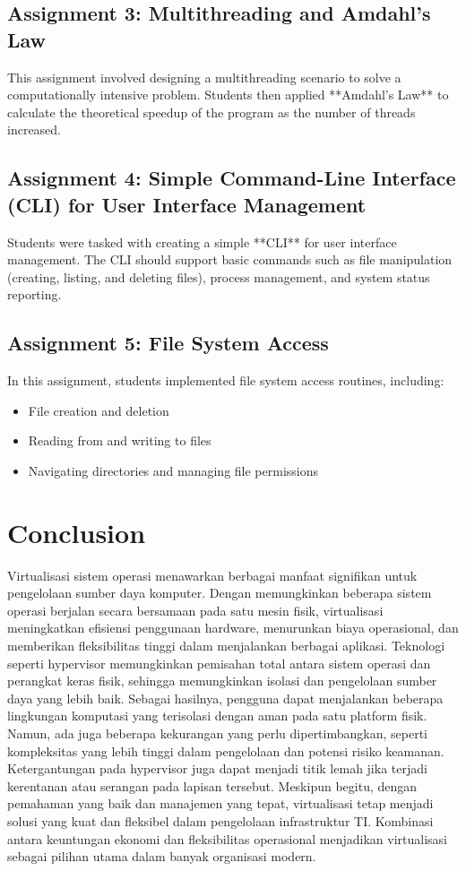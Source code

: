 \documentclass[12pt]{article}
\begin{document}
\subsection{Assignment 3: Multithreading and Amdahl's Law}
This assignment involved designing a multithreading scenario to solve a computationally intensive problem. Students then applied **Amdahl's Law** to calculate the theoretical speedup of the program as the number of threads increased.

\subsection{Assignment 4: Simple Command-Line Interface (CLI) for User Interface Management}
Students were tasked with creating a simple **CLI** for user interface management. The CLI should support basic commands such as file manipulation (creating, listing, and deleting files), process management, and system status reporting.

\subsection{Assignment 5: File System Access}
In this assignment, students implemented file system access routines, including:
\begin{itemize}
    \item File creation and deletion
    \item Reading from and writing to files
    \item Navigating directories and managing file permissions
\end{itemize}

\section{Conclusion}
Virtualisasi sistem operasi menawarkan berbagai manfaat signifikan untuk pengelolaan sumber daya komputer. Dengan memungkinkan beberapa sistem operasi berjalan secara bersamaan pada satu mesin fisik, virtualisasi meningkatkan efisiensi penggunaan hardware, menurunkan biaya operasional, dan memberikan fleksibilitas tinggi dalam menjalankan berbagai aplikasi. Teknologi seperti hypervisor memungkinkan pemisahan total antara sistem operasi dan perangkat keras fisik, sehingga memungkinkan isolasi dan pengelolaan sumber daya yang lebih baik. Sebagai hasilnya, pengguna dapat menjalankan beberapa lingkungan komputasi yang terisolasi dengan aman pada satu platform fisik.
Namun, ada juga beberapa kekurangan yang perlu dipertimbangkan, seperti kompleksitas yang lebih tinggi dalam pengelolaan dan potensi risiko keamanan. Ketergantungan pada hypervisor juga dapat menjadi titik lemah jika terjadi kerentanan atau serangan pada lapisan tersebut. Meskipun begitu, dengan pemahaman yang baik dan manajemen yang tepat, virtualisasi tetap menjadi solusi yang kuat dan fleksibel dalam pengelolaan infrastruktur TI. Kombinasi antara keuntungan ekonomi dan fleksibilitas operasional menjadikan virtualisasi sebagai pilihan utama dalam banyak organisasi modern.
\end{document}
